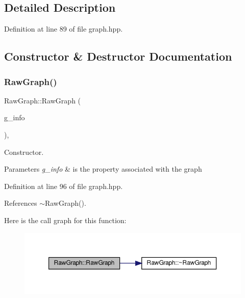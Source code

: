 \subsection{Detailed Description}


Definition at line 89 of file graph.\+hpp.



\subsection{Constructor \& Destructor Documentation}
\mbox{\label{structRawGraph_aa87e399ff7cf75bb36c18f28694188e2}} 
\subsubsection{\texorpdfstring{Raw\+Graph()}{RawGraph()}}
{\footnotesize\ttfamily Raw\+Graph\+::\+Raw\+Graph (\begin{DoxyParamCaption}\item[{\hyperlink{graph__info_8hpp_a4a5c364c379e5139b7dc97e7e69c7da3}{Graph\+Info\+Ref}}]{g\+\_\+info }\end{DoxyParamCaption})\hspace{0.3cm}{\ttfamily [inline]}, {\ttfamily [explicit]}}



Constructor. 


\begin{DoxyParams}{Parameters}
{\em g\+\_\+info} & is the property associated with the graph \\
\hline
\end{DoxyParams}


Definition at line 96 of file graph.\+hpp.



References $\sim$\+Raw\+Graph().

Here is the call graph for this function\+:
\nopagebreak
\begin{figure}[H]
\begin{center}
\leavevmode
\includegraphics[width=350pt]{dc/dd2/structRawGraph_aa87e399ff7cf75bb36c18f28694188e2_cgraph}
\end{center}
\end{figure}
\mbox{\label{structRawGraph_af9945c60018468ccc8071aee7dde6933}} 
